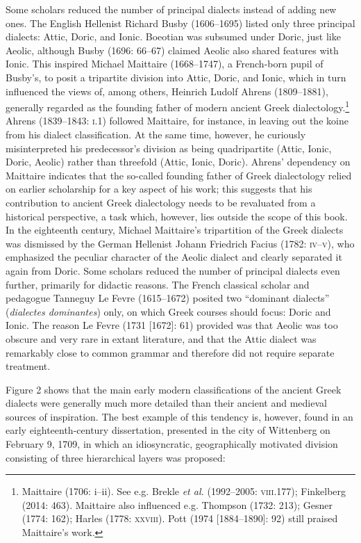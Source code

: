 \documentclass[12pt]{article}
\newenvironment{styleStandard}{\renewcommand\baselinestretch{1.25}\setlength\leftskip{0in}\setlength\rightskip{0in}\setlength\parindent{0.1972in}\setlength\parfillskip{0pt plus 1fil}\setlength\parskip{0in plus 1pt}\writerlistparindent\writerlistleftskip\leavevmode\normalfont\normalsize\writerlistlabel\ignorespaces}{\unskip\vspace{0in plus 1pt}\par}
\newcommand\writerlistleftskip{}
\newcommand\writerlistparindent{}
\newcommand\writerlistlabel{}
\newcounter{Figure}
\begin{document}
\begin{styleStandard}
Some scholars reduced the number of principal dialects instead of adding new ones. The English Hellenist Richard Busby (1606–1695) listed only three principal dialects: Attic, Doric, and Ionic. Boeotian was subsumed under Doric, just like Aeolic, although Busby (1696: 66–67) claimed Aeolic also shared features with Ionic. This inspired Michael Maittaire (1668–1747), a French-born pupil of Busby’s, to posit a tripartite division into Attic, Doric, and Ionic, which in turn influenced the views of, among others, Heinrich Ludolf Ahrens (1809–1881), generally regarded as the founding father of modern ancient Greek dialectology.\footnote{ Maittaire (1706: i–ii). See e.g. Brekle \textit{et al.} (1992–2005: \textsc{viii}.177); Finkelberg (2014: 463). Maittaire also influenced e.g. Thompson (1732: 213); Gesner (1774: 162); Harles (1778: \textsc{xxviii}). Pott (1974 [1884–1890]: 92) still praised Maittaire’s work.} Ahrens (1839–1843: \textsc{i.}1) followed Maittaire, for instance, in leaving out the koine from his dialect classification. At the same time, however, he curiously misinterpreted his predecessor’s division as being quadripartite (Attic, Ionic, Doric, Aeolic) rather than threefold (Attic, Ionic, Doric). Ahrens’ dependency on Maittaire indicates that the so-called founding father of Greek dialectology relied on earlier scholarship for a key aspect of his work; this suggests that his contribution to ancient Greek dialectology needs to be revaluated from a historical perspective, a task which, however, lies outside the scope of this book. In the eighteenth century, Michael Maittaire’s tripartition of the Greek dialects was dismissed by the German Hellenist Johann Friedrich Facius (1782: \textsc{iv–v}), who emphasized the peculiar character of the Aeolic dialect and clearly separated it again from Doric. Some scholars reduced the number of principal dialects even further, primarily for didactic reasons. The French classical scholar and pedagogue Tanneguy Le Fevre (1615–1672) posited two “dominant dialects” (\textit{dialectes dominantes}) only, on which Greek courses should focus: Doric and Ionic. The reason Le Fevre (1731 [1672]: 61) provided was that Aeolic was too obscure and very rare in extant literature, and that the Attic dialect was remarkably close to common grammar and therefore did not require separate treatment.
\end{styleStandard}

\begin{styleStandard}
Figure 2 shows that the main early modern classifications of the ancient Greek dialects were generally much more detailed than their ancient and medieval sources of inspiration. The best example of this tendency is, however, found in an early eighteenth-century dissertation, presented in the city of Wittenberg on February 9, 1709, in which an idiosyncratic, geographically motivated division consisting of three hierarchical layers was proposed:
\end{styleStandard}
\end{document}
